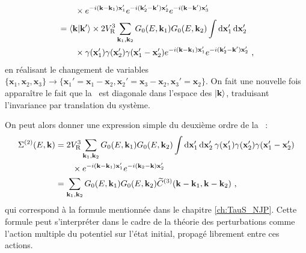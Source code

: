 \begin{align}
&\nonumber \qquad\times e^{-i(\mathbf{k}-\mathbf{k}_{\mathrm{1}})\mathbf{x}_{\mathrm{1}}'} e^{-i(\mathbf{k}_{\mathrm{2}}'-\mathbf{k}')\mathbf{x}_{\mathrm{2}}'} e^{-i(\mathbf{k}-\mathbf{k}')\mathbf{x}_{\mathrm{3}}'} \\
&=\langle \mathbf{k} | \mathbf{k}'\rangle \times 2 V_{\mathrm{R}}^3 \sum_{\mathbf{k}_{\mathrm{1}},\mathbf{k}_{\mathrm{2}}}{G_0(E,\mathbf{k}_{\mathrm{1}}) G_0(E,\mathbf{k}_{\mathrm{2}})} \int{\mathop{}\mathopen{}\mathrm{d}\mathbf{x}_{\mathrm{1}}'\mathop{}\mathopen{}\mathrm{d}\mathbf{x}_{\mathrm{2}}'} \\
&\nonumber \qquad\times \gamma(\mathbf{x}_{\mathrm{1}}')\gamma(\mathbf{x}_{\mathrm{2}}')\gamma(\mathbf{x}_{\mathrm{1}}'-\mathbf{x}_{\mathrm{2}}') e^{-i(\mathbf{k}-\mathbf{k}_{\mathrm{1}})\mathbf{x}_{\mathrm{1}}'} e^{-i(\mathbf{k}_{\mathrm{2}}'-\mathbf{k}')\mathbf{x}_{\mathrm{2}}'} \text{ ,}
\end{align}
en réalisant le changement de variables $\lbrace \mathbf{x}_{\mathrm{1}},\mathbf{x}_{\mathrm{2}},\mathbf{x}_{\mathrm{3}}\rbrace \rightarrow \lbrace \mathbf{x}_{\mathrm{1}}'=\mathbf{x}_{\mathrm{1}}-\mathbf{x}_{\mathrm{2}}, \mathbf{x}_{\mathrm{2}}'=\mathbf{x}_{\mathrm{3}}-\mathbf{x}_{\mathrm{2}}, \mathbf{x}_{\mathrm{3}}'=\mathbf{x}_{\mathrm{2}}\rbrace$. On fait une nouvelle fois apparaître le fait que la \selfenergy\ est diagonale dans l'espace des $\left| \mathbf{k} \right\rangle$, traduisant l'invariance par translation du système. 

On peut alors donner une expression simple du deuxième ordre de la \selfenergy\ :
\begin{align}
\Sigma^{(2)}(E,\mathbf{k})&= 2V_{\mathrm{R}}^3 \sum_{\mathbf{k}_{\mathrm{1}},\mathbf{k}_{\mathrm{2}}}{G_0(E,\mathbf{k}_{\mathrm{1}}) G_0(E,\mathbf{k}_{\mathrm{2}})} \int{\mathop{}\mathopen{}\mathrm{d}\mathbf{x}_{\mathrm{1}}' \mathop{}\mathopen{}\mathrm{d}\mathbf{x}_{\mathrm{2}}' \: \gamma(\mathbf{x}_{\mathrm{1}}')\gamma(\mathbf{x}_{\mathrm{2}}')\gamma(\mathbf{x}_{\mathrm{1}}'-\mathbf{x}_{\mathrm{2}}')}\\
&\nonumber\qquad\times e^{-i(\mathbf{k}-\mathbf{k}_{\mathrm{1}})\mathbf{x}_{\mathrm{1}}'} e^{-i(\mathbf{k}_{\mathrm{2}}-\mathbf{k})\mathbf{x}_{\mathrm{2}}'} \\
&= \sum_{\mathbf{k}_{\mathrm{1}},\mathbf{k}_{\mathrm{2}}}{G_0(E,\mathbf{k}_{\mathrm{1}}) G_0(E,\mathbf{k}_{\mathrm{2}}) \widetilde{C}^{(3)}(\mathbf{k}-\mathbf{k}_{\mathrm{1}},\mathbf{k}-\mathbf{k}_{\mathrm{2}})} \text{ ,}
\end{align}
qui correspond à la formule mentionnée dans le chapitre \ref{ch:TauS_NJP}. Cette formule peut s'interpréter dans le cadre de la théorie des perturbations comme l'action multiple du potentiel sur l'état initial, propagé librement entre ces actions.




